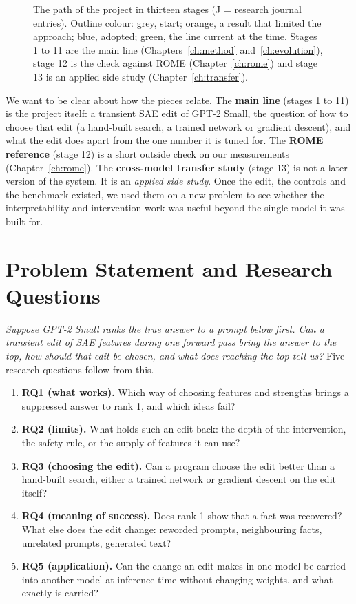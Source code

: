 \begin{figure}[!htb]
\centering
{}
\caption{The path of the project in thirteen stages (J = research journal entries). Outline colour: grey, start; orange, a result that limited the approach; blue, adopted; green, the line current at the time. Stages 1 to 11 are the main line (Chapters~\ref{ch:method} and~\ref{ch:evolution}), stage 12 is the check against ROME (Chapter~\ref{ch:rome}) and stage 13 is an applied side study (Chapter~\ref{ch:transfer}).}\label{fig:stages}
\end{figure}

We want to be clear about how the pieces relate. The \textbf{main line} (stages 1 to 11) is the project itself: a transient SAE edit of GPT-2 Small, the question of how to choose that edit (a hand-built search, a trained network or gradient descent), and what the edit does apart from the one number it is tuned for. The \textbf{ROME reference} (stage 12) is a short outside check on our measurements (Chapter~\ref{ch:rome}). The \textbf{cross-model transfer study} (stage 13) is not a later version of the system. It is an \emph{applied side study}. Once the edit, the controls and the benchmark existed, we used them on a new problem to see whether the interpretability and intervention work was useful beyond the single model it was built for.

\section{Problem Statement and Research Questions}

\textit{Suppose GPT-2 Small ranks the true answer to a prompt below first. Can a transient edit of SAE features during one forward pass bring the answer to the top, how should that edit be chosen, and what does reaching the top tell us?} Five research questions follow from this.
\begin{enumerate}
  \item \textbf{RQ1 (what works).} Which way of choosing features and strengths brings a suppressed answer to rank 1, and which ideas fail?
  \item \textbf{RQ2 (limits).} What holds such an edit back: the depth of the intervention, the safety rule, or the supply of features it can use?
  \item \textbf{RQ3 (choosing the edit).} Can a program choose the edit better than a hand-built search, either a trained network or gradient descent on the edit itself?
  \item \textbf{RQ4 (meaning of success).} Does rank 1 show that a fact was recovered? What else does the edit change: reworded prompts, neighbouring facts, unrelated prompts, generated text?
  \item \textbf{RQ5 (application).} Can the change an edit makes in one model be carried into another model at inference time without changing weights, and what exactly is carried?
\end{enumerate}

